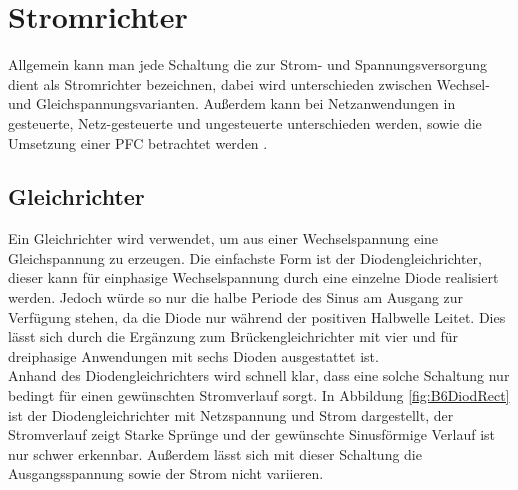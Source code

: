 \section{Stromrichter}
\label{sec:Stromrichter}
Allgemein kann man jede Schaltung die zur Strom- und Spannungsversorgung dient als Stromrichter bezeichnen, dabei wird unterschieden zwischen Wechsel- und Gleichspannungsvarianten. Außerdem kann bei Netzanwendungen in gesteuerte, Netz-gesteuerte und ungesteuerte unterschieden werden, sowie die Umsetzung einer \gls{PFC} betrachtet werden \cite{Schroder.2018}. 
		\subsection{Gleichrichter}
		Ein Gleichrichter wird verwendet, um aus einer Wechselspannung eine Gleichspannung zu erzeugen. Die einfachste Form ist der Diodengleichrichter, dieser kann für einphasige Wechselspannung durch eine einzelne Diode realisiert werden. Jedoch würde so nur die halbe Periode des Sinus am Ausgang zur Verfügung stehen, da die Diode nur während der positiven Halbwelle Leitet. Dies lässt sich durch die Ergänzung zum Brückengleichrichter mit vier und für dreiphasige Anwendungen mit sechs Dioden ausgestattet ist.\\
		Anhand des Diodengleichrichters wird schnell klar, dass eine solche Schaltung nur bedingt für einen gewünschten Stromverlauf sorgt. In Abbildung \ref{fig:B6DiodRect} ist der Diodengleichrichter mit Netzspannung und Strom dargestellt, der Stromverlauf zeigt Starke Sprünge und der gewünschte Sinusförmige Verlauf ist nur schwer erkennbar. Außerdem lässt sich mit dieser Schaltung die Ausgangsspannung sowie der Strom nicht variieren.
